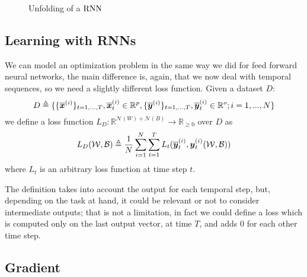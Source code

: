 \begin{figure}[h!]
\caption{Unfolding of a $\mathrm{RNN}$}
\label{rnn_unfolding}
\end{figure}


\subsection{Learning with RNNs}
We can model an optimization problem in the same way we did for feed forward neural networks, the main difference is, again, that we now deal with temporal sequences, so we need a slightly different loss function.
Given a dataset $D$:
\begin{equation}
D\triangleq\{\{\overline{\boldsymbol{x}}^{(i)}\}_{t=1,...,T}, \overline{\boldsymbol{x}}^{(i)}_t \in \mathbb{R}^p, \{\overline{\boldsymbol{y}}^{(i)}\}_{t=1,...,T}, \overline{\boldsymbol{y}}^{(i)}_t \in \mathbb{R}^o;  i=1,...,N\}
\end{equation}
we define a loss function $L_D:\mathbb{R}^{\mathcal{N}(W)+\mathcal{N}(B)} \rightarrow \mathbb{R}_{\geq 0}$ over $D$  as
\begin{equation}
L_D(\mathcal{W},\mathcal{B})\triangleq\frac{1}{N}\sum_{i=1}^N \sum_{t=1}^T L_t(\overline{\boldsymbol{y}}_t^{(i)},\boldsymbol{y}_t^{(i)}(\mathcal{W},\mathcal{B})) 
\end{equation}
where $L_t$ is an arbitrary loss function at time step $t$.

The definition takes into account the output for each temporal step, but, depending on the task at hand, it could be relevant or not to consider intermediate
outputs; that is not a limitation, in fact we could define a loss which is computed only on the last output vector, at time $T$, and adds 0 for each
other time step.

\subsection{Gradient}
\label{sec:rnn_grad}






